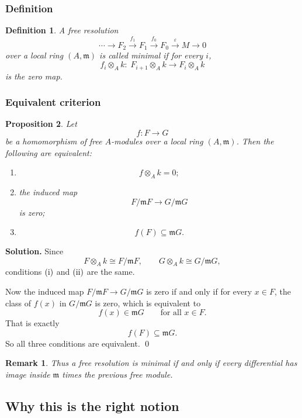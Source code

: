 \documentclass[12pt,a4paper]{article}
\theoremstyle{notespace}
\newtheorem{definition}{Definition}[section]
\newtheorem{remark}{Remark}[section]
\newtheorem{proposition}[definition]{Proposition}
\newcommand{\m}{\mathfrak m}
\begin{document}
\subsubsection{Definition}

\begin{definition}
	A free resolution
	\[
	\cdots \longrightarrow F_2 \xrightarrow{f_1} F_1 \xrightarrow{f_0} F_0 \xrightarrow{\varepsilon} M \longrightarrow 0
	\]
	over a local ring \((A,\m)\) is called \emph{minimal} if for every \(i\),
	\[
	f_i\otimes_A k:\; F_{i+1}\otimes_A k \to F_i\otimes_A k
	\]
	is the zero map.
\end{definition}

\subsubsection{Equivalent criterion}

\begin{proposition}
	Let
	\[
	f:F\to G
	\]
	be a homomorphism of free \(A\)-modules over a local ring \((A,\m)\). Then the following are equivalent:
	\begin{enumerate}[label=\textnormal{(\roman*)},leftmargin=2em]
		\item
		\[
		f\otimes_A k=0;
		\]
		\item the induced map
		\[
		F/\m F \to G/\m G
		\]
		is zero;
		\item
		\[
		f(F)\subseteq \m G.
		\]
	\end{enumerate}
\end{proposition}

\textbf{Solution.}
Since
\[
F\otimes_A k \cong F/\m F,
\qquad
G\otimes_A k \cong G/\m G,
\]
conditions \(\textnormal{(i)}\) and \(\textnormal{(ii)}\) are the same.

Now the induced map \(F/\m F \to G/\m G\) is zero if and only if for every \(x\in F\), the class of \(f(x)\) in \(G/\m G\) is zero, which is equivalent to
\[
f(x)\in \m G
\qquad\text{for all }x\in F.
\]
That is exactly
\[
f(F)\subseteq \m G.
\]
So all three conditions are equivalent. \qed

\begin{remark}
	Thus a free resolution is minimal if and only if every differential has image inside \(\m\) times the previous free module.
\end{remark}

\subsection{Why this is the right notion}
\end{document}
